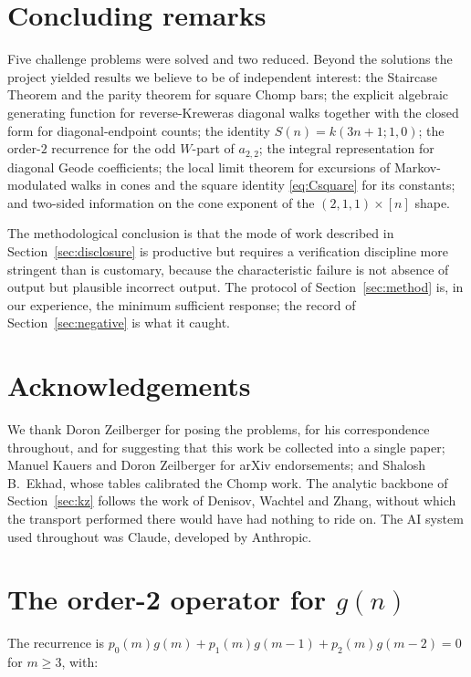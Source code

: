 \documentclass[11pt]{article}
\theoremstyle{definition}
\begin{document}
\section{Concluding remarks}

Five challenge problems were solved and two reduced. Beyond the solutions the
project yielded results we believe to be of independent interest: the Staircase
Theorem and the parity theorem for square Chomp bars; the explicit algebraic
generating function for reverse-Kreweras diagonal walks together with the
closed form for diagonal-endpoint counts; the identity $S(n)=k(3n+1;1,0)$; the
order-$2$ recurrence for the odd $W$-part of $a_{2,2}$; the integral
representation for diagonal Geode coefficients; the local limit theorem for
excursions of Markov-modulated walks in cones and the square identity
\eqref{eq:Csquare} for its constants; and two-sided information on the cone
exponent of the $(2,1,1)\times[n]$ shape.

The methodological conclusion is that the mode of work described in
Section~\ref{sec:disclosure} is productive but requires a verification
discipline more stringent than is customary, because the characteristic failure
is not absence of output but plausible incorrect output. The protocol of
Section~\ref{sec:method} is, in our experience, the minimum sufficient
response; the record of Section~\ref{sec:negative} is what it caught.

\section*{Acknowledgements}

We thank Doron Zeilberger for posing the problems, for his correspondence
throughout, and for suggesting that this work be collected into a single paper;
Manuel Kauers and Doron Zeilberger for arXiv endorsements; and Shalosh
B.~Ekhad, whose tables calibrated the Chomp work. The analytic backbone of
Section~\ref{sec:kz} follows the work of Denisov, Wachtel and Zhang, without
which the transport performed there would have had nothing to ride on. The AI
system used throughout was Claude, developed by Anthropic.

\appendix

\section{The order-2 operator for $g(n)$}\label{app:op}
The recurrence is $p_0(m)g(m)+p_1(m)g(m-1)+p_2(m)g(m-2)=0$ for $m\ge3$, with:

\end{document}
